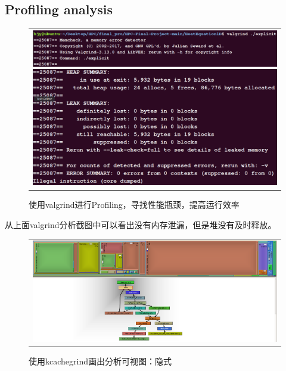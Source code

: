 \documentclass[3p]{elsarticle}
\numberwithin{equation}{section}
\begin{document}
    \subsection{Profiling analysis}
    
    \begin{figure}[h]
    	\begin{center}
    		\begin{tabular}{c}
    			\includegraphics[angle=0, scale=0.175]{./figures/valgrind1.png}
    			
    			\includegraphics[angle=0, scale=0.175]{./figures/valgrind2.png}
    		\end{tabular}
    	\end{center}
    	\caption{使用valgrind进行Profiling，寻找性能瓶颈，提高运行效率}
    	\label{fig:illustration-profiling}
    \end{figure}
    从上面valgrind分析截图中可以看出没有内存泄漏，但是堆没有及时释放。

    \begin{figure}[h]
    	\begin{center}
    		\begin{tabular}{c}
    			\includegraphics[angle=0, scale=0.35]{./figures/callgrind.png}
    		\end{tabular}
    	\end{center}
    	\caption{使用kcachegrind画出分析可视图：隐式}
    	\label{fig:illustration-callgrind}
    \end{figure} 
\end{document}
